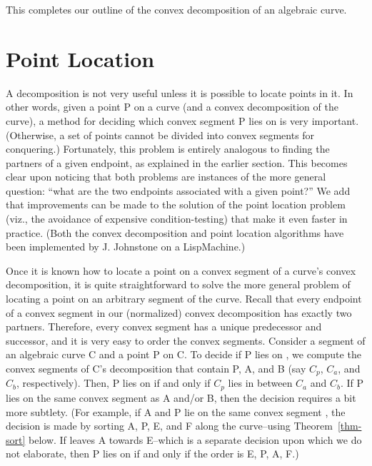 This completes our outline of the convex decomposition of an
algebraic curve.

\section{Point Location}
%
A decomposition is not very useful unless it is possible to locate points
in it. 
In other words, given a point P on a curve (and a convex decomposition of 
the curve), a method for deciding which convex segment P 
lies on is very important.
(Otherwise, a set of points cannot be divided into convex segments
for conquering.)
Fortunately, this problem 
is entirely analogous to finding the partners of a given endpoint, as explained
in the earlier section.
This becomes clear upon noticing that both problems are instances of 
the more general question:
``what are the two endpoints associated with a given point?''
We add that improvements can be made to the solution of the 
point location problem 
(viz., the avoidance of expensive condition-testing)
that make it even faster in practice.
(Both the convex decomposition and point location algorithms have
been implemented by J. Johnstone on a LispMachine.)

Once it is known how to locate a point on a convex segment of a curve's
convex decomposition, it is quite straightforward to solve the more
general problem of locating a point on an arbitrary segment of the curve.
Recall that every endpoint of a convex segment in our (normalized) convex
decomposition has exactly two partners.
Therefore, every convex segment has a unique predecessor and successor,
and it is very easy to order the convex segments.
Consider a segment  of an algebraic curve C and a point P on C.
To decide if P lies on , we compute the convex segments
of C's decomposition that contain P, A, and B (say $C_{p}$, $C_{a}$, and
$C_{b}$, respectively).
Then, P lies on  if and only if $C_{p}$ lies in between $C_{a}$ and
$C_{b}$.
If P lies on the same convex segment as A and/or B, then the decision
requires a bit more subtlety.
(For example, if A and P lie on the same convex segment ,
the decision is made by sorting A, P, E, and F along the curve--using 
Theorem~\ref{thm-sort} below.
If  leaves A towards E--which is a separate 
decision upon which we do not elaborate, then P lies on  
if and only if the order is E, P, A, F.)



